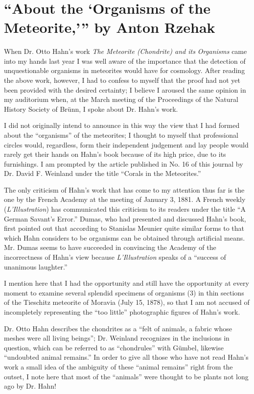 \documentclass[a4paper, 12pt, oneside]{article}
\begin{document}
\section{``About the `Organisms of the Meteorite,''' by Anton Rzehak}
\paragraph*{}
When Dr. Otto Hahn's work \emph{The Meteorite (Chondrite) and its Organisms} came into my hands last year I was well aware of the importance that the detection of unquestionable organisms in meteorites would have for cosmology. After reading the above work, however, I had to confess to myself that the proof had not yet been provided with the desired certainty; I believe I aroused the same opinion in my auditorium when, at the March meeting of the Proceedings of the Natural History Society of Brünn, I spoke about Dr. Hahn's work.

I did not originally intend to announce in this way the view that I had formed about the ``organisms'' of the meteorites; I thought to myself that professional circles would, regardless, form their independent judgement and lay people would rarely get their hands on Hahn's book because of its high price, due to its furnishings. I am prompted by the article published in No. 16 of this journal by Dr. David F. Weinland under the title ``Corals in the Meteorites.''

The only criticism of Hahn's work that has come to my attention thus far is the one by the French Academy at the meeting of January 3, 1881. A French weekly (\emph{L'Illustration}) has communicated this criticism to its readers under the title ``A German Savant's Error.'' Dumas, who had presented and discussed Hahn's book, first pointed out that according to Stanislas Meunier quite similar forms to that which Hahn considers to be organisms can be obtained through artificial means. Mr. Dumas seems to have succeeded in convincing the Academy of the incorrectness of Hahn's view because \emph{L'Illustration} speaks of a ``success of unanimous laughter.''

I mention here that I had the opportunity and still have the opportunity at every moment to examine several splendid specimens of organisms (3) in thin sections of the Tieschitz meteorite of Moravia (July 15, 1878), so that I am not accused of incompletely representing the ``too little'' photographic figures of Hahn's work.

Dr. Otto Hahn describes the chondrites as a ``felt of animals, a fabric whose meshes were all living beings''; Dr. Weinland recognizes in the inclusions in question, which can be referred to as ``chondrules'' with Gümbel, likewise ``undoubted animal remains.'' In order to give all those who have not read Hahn's work a small idea of the ambiguity of these ``animal remains'' right from the outset, I note here that most of the ``animals'' were thought to be plants not long ago by Dr. Hahn!
\end{document}
